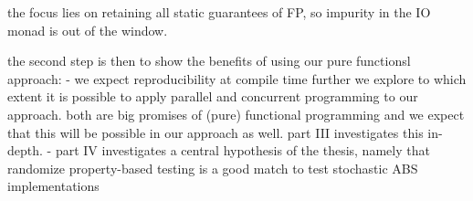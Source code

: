 the focus lies on retaining all static guarantees of FP, so impurity in the IO monad is out of the window. 

the second step is then to show the benefits of using our pure functionsl approach:
- we expect reproducibility at compile time
further we explore to which extent it is possible to apply parallel and concurrent programming to our approach. both are big promises of (pure) functional programming and we expect that this will be possible in our approach as well. part III investigates this in-depth.
- part IV investigates a central hypothesis of the thesis, namely that randomize property-based testing is a good match to test stochastic ABS implementations 